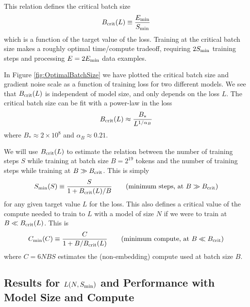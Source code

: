 \documentclass[english]{article}
\newcommand{\be}{\begin{equation}}
\newcommand{\ee}{\end{equation}}
\begin{document}
This relation defines the critical batch size 
\be
\label{eq:DefinitionBcrit}
B_{\rm crit}(L) \equiv \frac{E_{\rm min}}{S_{\rm min}}
\ee
which is a function of the target value of the loss.  Training at the critical batch size makes a roughly optimal time/compute tradeoff, requiring $2 S_{\rm min}$ training steps and processing $E = 2 E_{\rm min}$ data examples.  

In Figure \ref{fig:OptimalBatchSize} we have plotted the critical batch size and gradient noise scale as a function of training loss for two different models.  We see that $B_{\rm crit}(L)$ is  independent of model size, and only depends on the loss $L$.  The critical batch size can be fit with a power-law in the loss
\be
B_{\rm crit}(L) \approx \frac{B_*}{L^{1/\alpha_B}}
\ee
where $B_* \approx 2 \times 10^8$ and $\alpha_B \approx 0.21$.   

We will use $B_{\rm crit}(L)$ to estimate the relation between the number of training steps $S$ while training at batch size $B = 2^{19}$ tokens and the number of training steps while training at $B \gg B_{\rm crit}$.  This is simply
\be
\label{eq:AdjustedSteps}
S_{\rm min}(S) \equiv \frac{S}{1 + B_{\rm crit}(L)/B} \qquad (\text{minimum steps, at } B \gg B_{\rm crit})
\ee
for any given target value $L$ for the loss.  This also defines a critical value of the compute needed to train to $L$ with a model of size $N$ if we were to train at $B \ll B_{\rm crit}(L)$. This is
\be
\label{eq:AdjustedCompute}
C_{\rm min}(C) \equiv \frac{C  }{1 + B/B_{\rm crit}(L) } \qquad (\text{minimum compute, at } B \ll B_{\rm crit})
\ee
where $C = 6 N BS$ estimates the (non-embedding) compute used at batch size $B$.

\subsection{Results for $L(N, S_{\rm min})$ and Performance with Model Size and Compute}
\end{document}

